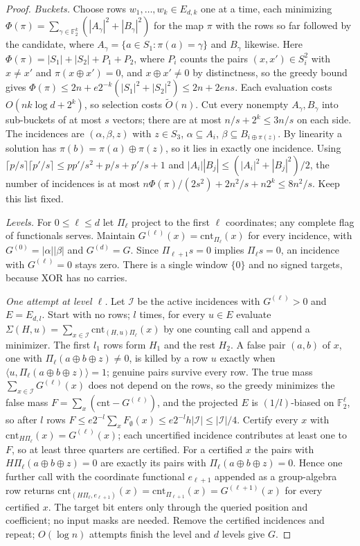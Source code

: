 \documentclass[11pt]{article}
\newcommand{\softO}{\widetilde O}
\begin{document}
\begin{proof}
\emph{Buckets.}  Choose rows $w_1,\dots,w_k\in E_{d,k}$ one at a time,
each minimizing
$\Phi(\pi)=\sum_{\gamma\in\mathbb F_2^k}(|A_\gamma|^2+|B_\gamma|^2)$ for
the map $\pi$ with the rows so far followed by the candidate, where
$A_\gamma=\{a\in S_1:\pi(a)=\gamma\}$ and $B_\gamma$ likewise.  Here
$\Phi(\pi)=|S_1|+|S_2|+P_1+P_2$, where $P_i$ counts the pairs $(x,x')\in S_i^2$
with $x\ne x'$ and $\pi(x\oplus x')=0$, and $x\oplus x'\ne0$ by
distinctness, so the greedy
bound gives $\Phi(\pi)\le2n+e2^{-k}(|S_1|^2+|S_2|^2)\le2n+2ens$.  Each
evaluation costs $O(nk\log d+2^k)$, so selection costs $\softO(n)$.  Cut
every nonempty $A_\gamma,B_\gamma$ into sub-buckets of at most $s$
vectors; there are at most $n/s+2^k\le3n/s$ on each side.  The
incidences are $(\alpha,\beta,z)$ with $z\in S_3$, $\alpha\subseteq A_i$,
$\beta\subseteq B_{i\oplus\pi(z)}$.  By linearity a solution has
$\pi(b)=\pi(a)\oplus\pi(z)$, so it lies in exactly one incidence.  Using
$\lceil p/s\rceil\lceil p'/s\rceil\le pp'/s^2+p/s+p'/s+1$ and
$|A_i||B_j|\le(|A_i|^2+|B_j|^2)/2$, the number of incidences is at most
$n\Phi(\pi)/(2s^2)+2n^2/s+n2^k\le8n^2/s$.  Keep this list fixed.

\emph{Levels.}  For $0\le\ell\le d$ let $\Pi_\ell$ project to the first
$\ell$ coordinates; any complete flag of functionals serves.  Maintain
$G^{(\ell)}(x)=\mathrm{cnt}_{\Pi_\ell}(x)$ for every incidence, with
$G^{(0)}=|\alpha||\beta|$ and $G^{(d)}=G$.  Since $\Pi_{\ell+1}s=0$
implies $\Pi_\ell s=0$, an incidence with $G^{(\ell)}=0$ stays zero.
There is a single window $\{0\}$ and no signed targets, because XOR has
no carries.

\emph{One attempt at level $\ell$.}  Let $\mathcal I$ be the active
incidences with $G^{(\ell)}>0$ and $E=E_{d,l}$.  Start with no rows;
$l$ times, for every $u\in E$ evaluate
$\Sigma(H,u)=\sum_{x\in\mathcal I}\mathrm{cnt}_{(H,u)\Pi_\ell}(x)$ by one
counting call and append a minimizer.  The first $l_1$ rows form $H_1$
and the rest $H_2$.  A false pair $(a,b)$ of $x$, one with
$\Pi_\ell(a\oplus b\oplus z)\ne0$, is killed by a row $u$ exactly when
$\langle u,\Pi_\ell(a\oplus b\oplus z)\rangle=1$; genuine pairs survive
every row.  The true mass $\sum_{x\in\mathcal I}G^{(\ell)}(x)$ does not
depend on the rows, so the greedy minimizes the false mass
$F=\sum_x(\mathrm{cnt}-G^{(\ell)})$, and the projected $E$ is
$(1/l)$-biased on $\mathbb F_2^\ell$, so after $l$ rows
$F\le e2^{-l}\sum_xF_\emptyset(x)\le e2^{-l}h|\mathcal I|
\le|\mathcal I|/4$.  Certify every $x$ with
$\mathrm{cnt}_{H\Pi_\ell}(x)=G^{(\ell)}(x)$; each uncertified incidence
contributes at least one to $F$, so at least three quarters are
certified.  For a certified $x$ the pairs with
$H\Pi_\ell(a\oplus b\oplus z)=0$ are exactly its pairs with
$\Pi_\ell(a\oplus b\oplus z)=0$.  Hence one further call with the
coordinate functional $e_{\ell+1}$ appended as a group-algebra row
returns $\mathrm{cnt}_{(H\Pi_\ell,e_{\ell+1})}(x)
=\mathrm{cnt}_{\Pi_{\ell+1}}(x)=G^{(\ell+1)}(x)$ for every certified $x$.
The target bit enters only through the queried position and
coefficient; no input masks are needed.  Remove the certified incidences
and repeat; $O(\log n)$ attempts finish the level and $d$ levels give $G$.


\end{proof}
\end{document}
